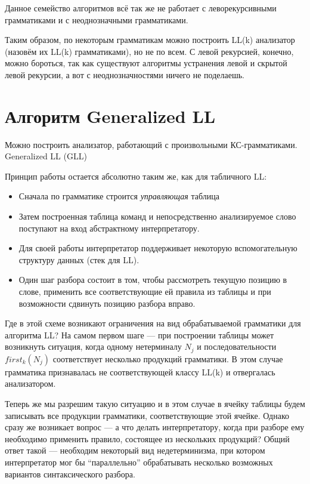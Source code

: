 Данное семейство алгоритмов всё так же не работает с леворекурсивными грамматиками и с неоднозначными грамматиками.

Таким образом, по некоторым грамматикам можно построить LL(k) анализатор (назовём их LL(k) грамматиками), но не по всем.
С левой рекурсией, конечно, можно бороться, так как существуют алгоритмы устранения левой и скрытой левой рекурсии, а вот с неоднозначностями ничего не поделаешь.



\section{Алгоритм Generalized LL}

Можно построить анализатор, работающий с произвольными КС-грамматиками.
Generalized LL (GLL)~\cite{Scott:2010:GP:1860132.1860320,10.1007/978-3-662-46663-6_5}

Принцип работы остается абсолютно таким же, как для табличного LL:
\begin{itemize}
  \item Сначала по грамматике строится \textit{управляющая} таблица
  \item Затем построенная таблица команд и непосредственно анализируемое слово поступают на вход абстрактному интерпретатору.
  \item Для своей работы интерпретатор поддерживает некоторую вспомогательную структуру данных (стек для LL).
  \item Один шаг разбора состоит в том, чтобы рассмотреть текущую позицию в слове, применить все соответствующие ей правила из таблицы и при возможности сдвинуть позицию разбора вправо.
\end{itemize}

Где в этой схеме возникают ограничения на вид обрабатываемой грамматики для алгоритма LL? На самом первом шаге --- при построении таблицы может возникнуть ситуация, когда одному нетерминалу $N_j$ и последовательности $first_k(N_j)$ соответствует несколько продукций грамматики. В этом случае грамматика признавалась не соответствующей классу LL(k) и отвергалась анализатором.

Теперь же мы разрешим такую ситуацию и в этом случае в ячейку таблицы будем записывать все продукции грамматики, соответствующие этой ячейке. Однако сразу же возникает вопрос --- а что делать интерпретатору, когда при разборе ему необходимо применить правило, состоящее из нескольких продукций? Общий ответ такой --- необходим некоторый вид недетерминизма, при котором интерпретатор мог бы ``параллельно'' обрабатывать несколько возможных вариантов синтаксического разбора.

